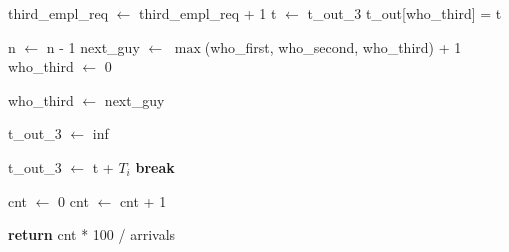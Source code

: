 \documentclass{article}
\newenvironment{allintypewriter}{\ttfamily}{\par}
\begin{document}
\begin{allintypewriter}
\begin{algorithmic}[1]
                            \State third\_empl\_req $\gets$ third\_empl\_req + 1
                            \State t $\gets$ t\_out\_3
                            \State t\_out[who\_third] = t

                            \State n $\gets$ n - 1
                            \State next\_guy $\gets$ $\max$(who\_first, who\_second, who\_third) + 1
                            \State who\_third $\gets$ 0 

                                \State who\_third $\gets$ next\_guy
                            \EndIf

                                \State t\_out\_3 $\gets$ inf

                            \Else
                                \State t\_out\_3 $\gets$ t + $T_i$ 
                            \EndIf
                        \Else
                            \State \textbf{break}
                        \EndIf
                    \EndWhile

                    \State cnt $\gets$ 0
                            \State cnt $\gets$ cnt + 1
                        \EndIf
                    \EndFor

                    \State \textbf{return} cnt * 100 / arrivals
                \EndFunction
            \end{algorithmic}
        \end{allintypewriter}
\end{document}
